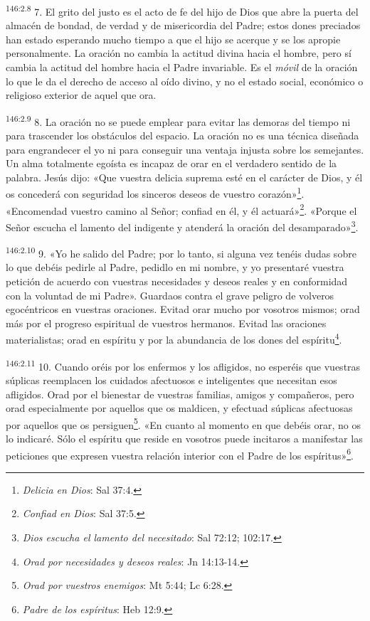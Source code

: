 \par 
\textsuperscript{146:2.8} 7. El grito del justo es el acto de fe del hijo de Dios que abre la puerta del almacén de bondad, de verdad y de misericordia del Padre; estos dones preciados han estado esperando mucho tiempo a que el hijo se acerque y se los apropie personalmente. La oración no cambia la actitud divina hacia el hombre, pero sí cambia la actitud del hombre hacia el Padre invariable. Es el \textit{móvil} de la oración lo que le da el derecho de acceso al oído divino, y no el estado social, económico o religioso exterior de aquel que ora.

\par 
\textsuperscript{146:2.9} 8. La oración no se puede emplear para evitar las demoras del tiempo ni para trascender los obstáculos del espacio. La oración no es una técnica diseñada para engrandecer el yo ni para conseguir una ventaja injusta sobre los semejantes. Un alma totalmente egoísta es incapaz de orar en el verdadero sentido de la palabra. Jesús dijo: «Que vuestra delicia suprema esté en el carácter de Dios, y él os concederá con seguridad los sinceros deseos de vuestro corazón»\footnote{\textit{Delicia en Dios}: Sal 37:4.}. «Encomendad vuestro camino al Señor; confiad en él, y él actuará»\footnote{\textit{Confiad en Dios}: Sal 37:5.}. «Porque el Señor escucha el lamento del indigente y atenderá la oración del desamparado»\footnote{\textit{Dios escucha el lamento del necesitado}: Sal 72:12; 102:17.}.

\par 
\textsuperscript{146:2.10} 9. «Yo he salido del Padre; por lo tanto, si alguna vez tenéis dudas sobre lo que debéis pedirle al Padre, pedidlo en mi nombre, y yo presentaré vuestra petición de acuerdo con vuestras necesidades y deseos reales y en conformidad con la voluntad de mi Padre». Guardaos contra el grave peligro de volveros egocéntricos en vuestras oraciones. Evitad orar mucho por vosotros mismos; orad más por el progreso espiritual de vuestros hermanos. Evitad las oraciones materialistas; orad en espíritu y por la abundancia de los dones del espíritu\footnote{\textit{Orad por necesidades y deseos reales}: Jn 14:13-14.}.

\par 
\textsuperscript{146:2.11} 10. Cuando oréis por los enfermos y los afligidos, no esperéis que vuestras súplicas reemplacen los cuidados afectuosos e inteligentes que necesitan esos afligidos. Orad por el bienestar de vuestras familias, amigos y compañeros, pero orad especialmente por aquellos que os maldicen, y efectuad súplicas afectuosas por aquellos que os persiguen\footnote{\textit{Orad por vuestros enemigos}: Mt 5:44; Lc 6:28.}. «En cuanto al momento en que debéis orar, no os lo indicaré. Sólo el espíritu que reside en vosotros puede incitaros a manifestar las peticiones que expresen vuestra relación interior con el Padre de los espíritus»\footnote{\textit{Padre de los espíritus}: Heb 12:9.}.

